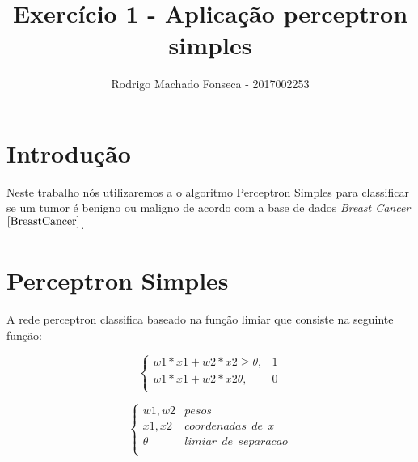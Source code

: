 \documentclass[12pt]{article}
\begin{document}

\pagestyle{fancy}
\fancyhf{}
\renewcommand{\headrulewidth}{0.4pt}
\fancyfoot[C]{\thepage}
\renewcommand{\footrulewidth}{0.4pt}
\fancyfoot[C]{\thepage}
\title{\LARGE \bf
 Exercício 1 - Aplicação perceptron simples}
\author{ Rodrigo Machado Fonseca - 2017002253}
\thispagestyle{fancy}
\maketitle
\thispagestyle{fancy}

\section{Introdução}
  \par Neste trabalho nós utilizaremos a o algoritmo Perceptron Simples para classificar se um tumor é benigno ou maligno de acordo com a base de dados \textit{Breast Cancer}$^{\ref{BreastCancer}}$.

\section{Perceptron Simples}

  \par A rede perceptron classifica baseado na função limiar que consiste na seguinte função:

\begin{equation}
\left \{
  \begin{array}{cc}
  w1*x1 + w2*x2 \geq \theta, & 1 \\
  w1*x1 + w2*x2  \theta, & 0 \\
  \end{array}
  \right.
  \label{eq:limiar1}
\end{equation}
  
\begin{equation*}
  \left \{
    \begin{array}{cc}
    w1,w2 & pesos \\
    x1,x2 & coordenadas \ \  de \ \ x \\
    \theta & limiar \ \  de \ \  separacao \\
    \end{array}
    \right.
\end{equation*}
\end{document}
